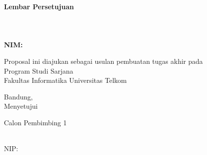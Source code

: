 {\centering
\textbf{\large Lembar Persetujuan}\\
\vspace{0.5cm}
\textbf{\Title}\\
\vspace{0.5cm}
\textbf{\textit{\EngTitle}}\\
\vspace{0.5cm}
\textbf{\Author}\\
\textbf{NIM: \NIM}\\
\vspace{1cm}


{ Proposal ini diajukan sebagai usulan pembuatan tugas akhir pada\\ Program Studi Sarjana \Prodi\\ Fakultas Informatika Universitas Telkom}\\

\vspace{0.5cm}

{Bandung, \Tanggal\quad \Bulan \quad \Date}\\
{Menyetujui}\\

\vspace{0.5cm}
      \ifPembimbingHanyaSatu
         \begin{center}
         Calon Pembimbing 1
         \vspace{2.2cm}

         \underline{\PembimbingSatu} \\ 
         NIP: \NIPPembimbingSatu
         \end{center}
      \else
         \begin{center}
         \noindent{}
         \end{center}
      \fi
\vspace{0.5cm}

}